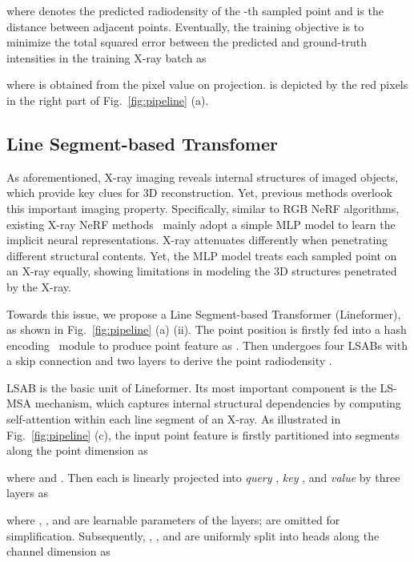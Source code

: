 \documentclass[10pt,twocolumn,letterpaper]{article}
\begin{document}
where  denotes the predicted radiodensity of the -th sampled point and  is the distance between adjacent points. Eventually, the training objective is to minimize the total squared error  between the predicted and ground-truth intensities in the training X-ray batch  as
\vspace{0.1mm}

where  is obtained from the pixel value on  projection.  is depicted by the red pixels in the right part of Fig.~\ref{fig:pipeline} (a).

\subsection{Line Segment-based Transfomer}
As aforementioned, X-ray imaging reveals internal structures of imaged objects, which provide key clues for 3D reconstruction. Yet, previous methods overlook this important imaging property. Specifically, similar to RGB NeRF algorithms, existing X-ray NeRF methods~\cite{naf,intratomo} mainly adopt a simple MLP model to learn the implicit neural representations. X-ray attenuates differently when penetrating different structural contents. Yet, the MLP model treats each sampled point on an X-ray equally, showing limitations in modeling the 3D structures penetrated by the X-ray.

Towards this issue, we propose a Line Segment-based Transformer (Lineformer), as shown in Fig.~\ref{fig:pipeline} (a) (ii). The point position  is firstly fed into a hash encoding~\cite{instant_ngp} module  to produce point feature  as . Then  undergoes four LSABs with a skip connection and two  layers to derive the point radiodensity .

LSAB is the basic unit of Lineformer. Its most important component is the LS-MSA mechanism, which captures internal structural dependencies by computing self-attention within each line segment of an X-ray. As illustrated in Fig.~\ref{fig:pipeline} (c), the input point feature  is firstly partitioned into  segments along the point dimension as
\vspace{-0.5mm}

where  and . Then each  is linearly projected into  \emph{query} , \emph{key} , and \emph{value}  by three  layers as
\vspace{0.1mm}

where , , and  are learnable parameters of the  layers;  are omitted for simplification. Subsequently, , , and  are uniformly split into  heads along the channel dimension as
\end{document}
